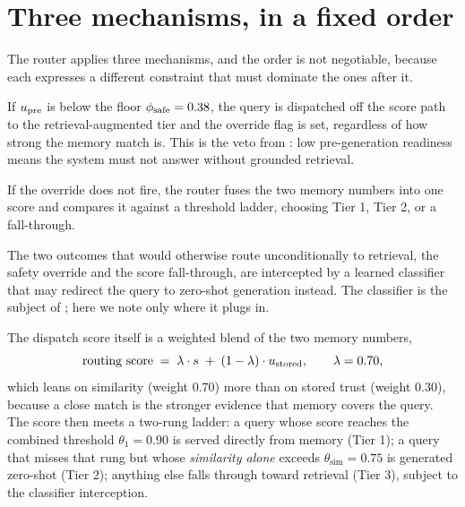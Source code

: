 \section{Three mechanisms, in a fixed order}
\label{sec:router-mechanisms}

The router applies three mechanisms, and the order is not negotiable, because each
expresses a different constraint that must dominate the ones after it.

\begin{description}[leftmargin=0pt, labelsep=0.5em, style=nextline]
  \item[Mechanism 1, the safety override (checked first).] If $u_{\text{pre}}$ is below the
  floor $\phi_{\text{safe}} = 0.38$, the query is dispatched off the score path to the
  retrieval-augmented tier and the override flag is set, regardless of how strong
  the memory match is. This is the veto from : low pre-generation
  readiness means the system must not answer without grounded retrieval.
  \item[Mechanism 2, the dispatch score.] If the override does not fire, the router
  fuses the two memory numbers into one score and compares it against a threshold
  ladder, choosing Tier 1, Tier 2, or a fall-through.
  \item[Mechanism 3, the retrieval-utility classifier (Stage 3b).] The two
  outcomes that would otherwise route unconditionally to retrieval, the safety
  override and the score fall-through, are intercepted by a learned classifier that
  may redirect the query to zero-shot generation instead. The classifier is the
  subject of ; here we note only where it plugs in.
\end{description}

The dispatch score itself is a weighted blend of the two memory numbers,
\[
  \text{routing score} \;=\; \lambda \cdot s \;+\; (1-\lambda)\cdot u_{\text{stored}},
  \qquad \lambda = 0.70,
\]
which leans on similarity (weight $0.70$) more than on stored trust (weight
$0.30$), because a close match is the stronger evidence that memory covers the
query. The score then meets a two-rung ladder: a query whose score reaches the
combined threshold $\theta_1 = 0.90$ is served directly from memory (Tier 1); a
query that misses that rung but whose \emph{similarity alone} exceeds
$\theta_{\text{sim}} = 0.75$ is generated zero-shot (Tier 2); anything else falls
through toward retrieval (Tier 3), subject to the classifier interception.

